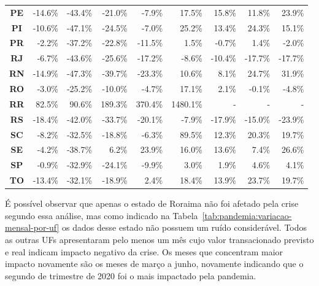 \begin{table}[htb]
\begin{tabular}{c|r|r|r|r|r|r|r|r}
        \textbf{PE} & -14.6\% & -43.4\% & -21.0\% &  -7.9\% &   17.5\% &    15.8\% &    11.8\% &   23.9\% \\
        \textbf{PI} & -10.6\% & -47.1\% & -24.5\% &  -7.0\% &   25.2\% &    13.4\% &    24.3\% &   15.1\% \\
        \textbf{PR} &  -2.2\% & -37.2\% & -22.8\% & -11.5\% &    1.5\% &    -0.7\% &     1.4\% &   -2.0\% \\
        \textbf{RJ} &  -6.7\% & -43.6\% & -25.6\% & -17.2\% &   -8.6\% &   -10.4\% &   -17.7\% &  -17.7\% \\
        \textbf{RN} & -14.9\% & -47.3\% & -39.7\% & -23.3\% &   10.6\% &     8.1\% &    24.7\% &   31.9\% \\
        \textbf{RO} &  -3.0\% & -25.2\% & -10.0\% &  -4.7\% &   17.1\% &     2.1\% &    -0.1\% &   -4.8\% \\
        \textbf{RR} &  82.5\% &  90.6\% & 189.3\% & 370.4\% & 1480.1\% & - & - & - \\
        \textbf{RS} & -18.4\% & -42.0\% & -33.7\% & -20.1\% &   -7.9\% &   -17.9\% &   -15.0\% &  -23.9\% \\
        \textbf{SC} &  -8.2\% & -32.5\% & -18.8\% &  -6.3\% &   89.5\% &    12.3\% &    20.3\% &   19.7\% \\
        \textbf{SE} &  -4.2\% & -38.7\% &   6.2\% &  23.9\% &   16.0\% &    13.6\% &     7.4\% &   26.6\% \\
        \textbf{SP} &  -0.9\% & -32.9\% & -24.1\% &  -9.9\% &    3.0\% &     1.9\% &     4.6\% &    4.1\% \\
        \textbf{TO} & -13.4\% & -32.1\% & -18.9\% &   2.4\% &   18.4\% &    13.9\% &    23.7\% &   19.7\% \\
        \bottomrule
    \end{tabular}
\fdadospesquisa
\end{table}

É possível observar que apenas o estado de Roraima não foi afetado pela crise segundo essa análise, mas como indicado na Tabela~\ref{tab:pandemia:variacao-mensal-por-uf} os dados desse estado não possuem um ruído considerável. Todos as outras UFs apresentaram pelo menos um mês cujo valor transacionado previsto e real indicam impacto negativo da crise. Os meses que concentram maior impacto novamente são os meses de março a junho, novamente indicando que o segundo de trimestre de 2020 foi o mais impactado pela pandemia.

